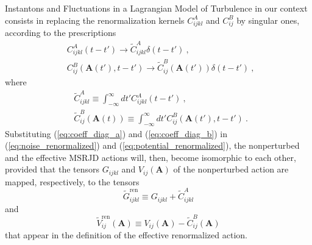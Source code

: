 \begin{chapter}{Instantons and Fluctuations in a Lagrangian Model of Turbulence}
in our context consists in replacing the renormalization kernels $C^A_{ijkl}$ and $C^B_{ij}$ by singular ones, 
according to the prescriptions
\begin{subequations}
\begin{align}
&C^A_{ijkl}(t-t') \rightarrow \tilde C^A_{ijkl} \delta(t-t') \ , \ \\
&C^B_{ij}({\mathbf{A}}(t'), t-t') \rightarrow \tilde C^B_{ij}({\mathbf{A}}(t')) \delta(t-t') \ , \ 
\end{align}
\end{subequations}
where
\begin{subequations}
\begin{align}
& \tilde C^A_{ijkl} \equiv  \int_{- \infty}^\infty dt'  C^A_{ijkl}(t- t') \ , \ \label{eq:coeff_diag_a}\\
& \tilde C^B_{ij}({\mathbf{A}}(t)) \equiv \int_{- \infty}^\infty dt'  C^B_{ij}({\mathbf{A}}(t'),t-t') \ . \ \label{eq:coeff_diag_b}
\end{align}
\end{subequations}
Substituting (\ref{eq:coeff_diag_a}) and (\ref{eq:coeff_diag_b}) in (\ref{eq:noise_renormalized}) and 
(\ref{eq:potential_renormalized}), the nonperturbed and the effective MSRJD actions will, then, become
isomorphic to each other, provided that the tensors
$G_{ijkl}$ and $V_{ij}({\mathbf{A}})$ of the nonperturbed action are mapped, respectively, to the tensors
\begin{equation} \label{eq:g_renc}
\tilde G_{ijkl}^{\mathrm{ren}} \equiv  G_{ijkl} + \tilde C^A_{ijkl} 
\end{equation}
and
\begin{equation} \label{eq:v_renc}
\tilde V_{ij}^{\mathrm{ren}}({\mathbf{A}}) \equiv V_{ij}({\mathbf{A}})  - \tilde C^B_{ij}({\mathbf{A}}) 
\end{equation}
that appear in the definition of the effective renormalized action.


\end{chapter}
